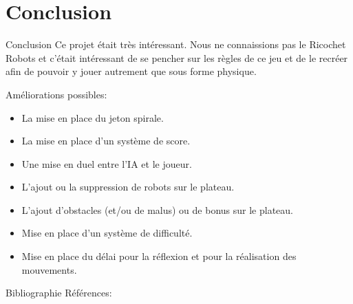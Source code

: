 \documentclass{beamer}
\begin{document}
    \section{Conclusion}
        \begin{frame}{Conclusion}
            Ce projet était très intéressant. Nous ne connaissions pas le Ricochet Robots et c'était intéressant de se pencher sur les règles de ce jeu et de le recréer afin de pouvoir y jouer autrement que sous forme physique.
    
            \vspace{0.5cm}
            Améliorations possibles:
            \begin{itemize}
                \item La mise en place du jeton spirale. 
                \item La mise en place d'un système de score.
                \item Une mise en duel entre l'IA et le joueur.
                \item L'ajout ou la suppression de robots sur le plateau.
                \item L'ajout d'obstacles (et/ou de malus) ou de bonus sur le plateau. 
                \item Mise en place d'un système de difficulté.
                \item Mise en place du délai pour la réflexion et pour la réalisation des mouvements.
            \end{itemize}
        \end{frame}
\begin{frame}{Bibliographie}
    Références:
    
    
\end{frame}
\end{document}
